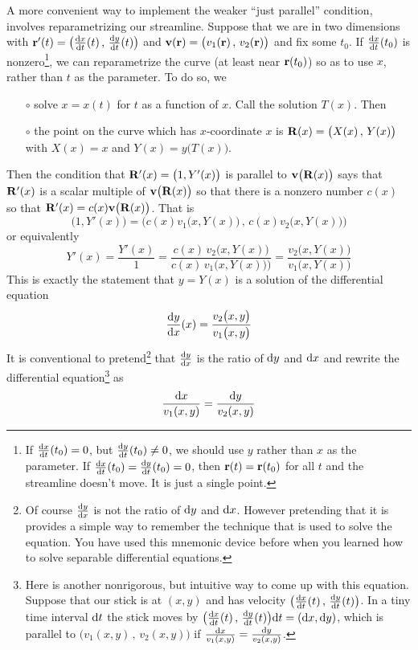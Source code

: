 A more convenient way to implement the weaker ``just parallel'' 
condition, involves reparametrizing our streamline. 
Suppose that we are in two dimensions 
with $\vr'(t)=\big(\diff{x}{t}(t)\,,\,\diff{y}{t}(t)\big)$ and
$\mathbf{v}(\mathbf{r})=\big(v_1(\mathbf{r})\,,\,v_2(\mathbf{r})\big)$  and fix some $t_0$. If $\diff{x}{t}(t_0)$ is 
nonzero\footnote{If $\diff{x}{t}(t_0)=0$,
but $\diff{y}{t}(t_0)\ne 0$, we should use $y$ rather than $x$ as the 
parameter. If $\diff{x}{t}(t_0)=\diff{y}{t}(t_0)=0$, then $\mathbf{r}(t)=\mathbf{r}(t_0)$
for all $t$ and the streamline doesn't move. It is just a single point.}, 
we can reparametrize the curve (at least near $\mathbf{r}(t_0)$) so as to use $x$, rather than $t$ as the parameter. To do so, we
\begin{itemize}\itemsep1pt \parskip0pt  %
\item[$\circ$] solve $x=x(t)$ for $t$ as a function of $x$. Call 
the solution $T(x)$. Then
\item[$\circ$] the point on the curve which has $x$-coordinate $x$ is 
$\mathbf{R}(x)=\big(X(x)\,,\,Y(x)\big)$ with $X(x)=x$ and $Y(x) = y\big(T(x)\big)$. 
\end{itemize}
Then the condition that $\mathbf{R}'(x)=\big(1,Y'(x)\big)$ is parallel to $\mathbf{v}\big(\mathbf{R}(x)\big)$ says that $\mathbf{R}'(x)$ is a scalar multiple of
$\mathbf{v}\big(\mathbf{R}(x)\big)$ so that 
there is a nonzero number $c(x)$ so that $\mathbf{R}'(x)=c(x) \mathbf{v}\big(\mathbf{R}(x)\big)$. That is
\begin{equation*}
\big(1,Y'(x)\big) 
   =\big( c(x)v_1\big(x,Y(x)\big)\,,\, c(x)v_2\big(x,Y(x)\big)  \big)
\end{equation*}
or equivalently
\begin{equation*}
Y'(x)=\frac{Y'(x)}{1}
=\frac{c(x)\,v_2\big(x,Y(x)\big)}{c(x)\,v_1\big(x,Y(x)\big)\big)}
=\frac{v_2\big(x,Y(x)\big)}{v_1\big(x,Y(x)\big)}
\end{equation*}
This is exactly the statement that $y=Y(x)$ is a solution of the differential equation
\begin{equation*}
\diff{y}{x}(x) = \frac{v_2\big(x,y\big)}{v_1\big(x,y\big)}
\end{equation*}
It is conventional to pretend\footnote{Of course $\diff{y}{x}$ is not the ratio of $\mathrm{d}y$ and $\mathrm{d}x$. However pretending that it is provides a simple
way to remember the technique that is used to solve the equation. You have used this mnemonic device before when you learned how to solve separable differential equations.} 
that $\diff{y}{x}$ is the ratio of $\mathrm{d}y$ and $\mathrm{d}x$ and rewrite the differential equation\footnote{Here is another nonrigorous, but intuitive way
to come up with this equation. Suppose that our stick is at $(x,y)$ 
and has velocity $\big(\diff{x}{t}(t)\,,\,\diff{y}{t}(t)\big)$. 
In a tiny time interval $\mathrm{d}t$ the stick moves by $\big(\diff{x}{t}(t)\,,\,\diff{y}{t}(t)\big)\dee{t}
=(\dee{x},\dee{y})$, which is parallel to  $\big(v_1(x,y)\,,\,v_2(x,y)\big)$
if $\frac{\mathrm{d}x}{v_1(x,y)}=\frac{\mathrm{d}y}{v_2(x,y)}$.} as
\begin{equation*}
\frac{\mathrm{d}x}{v_1(x,y)}=\frac{\mathrm{d}y}{v_2(x,y)}
\end{equation*}

